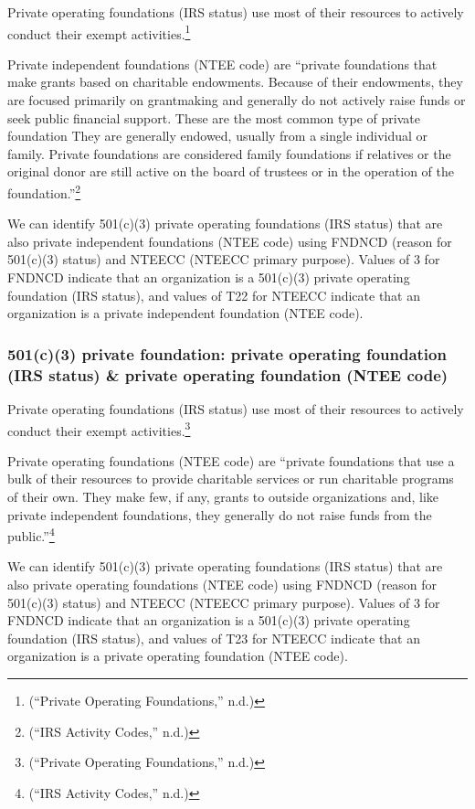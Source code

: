 \documentclass[
  letterpaper,
  DIV=11,
  numbers=noendperiod]{scrreprt}
\begin{document}
Private operating foundations (IRS status) use most of their resources
to actively conduct their exempt activities.\footnote{({``Private
  Operating Foundations,''} n.d.)}

Private independent foundations (NTEE code) are ``private foundations
that make grants based on charitable endowments. Because of their
endowments, they are focused primarily on grantmaking and generally do
not actively raise funds or seek public financial support. These are the
most common type of private foundation They are generally endowed,
usually from a single individual or family. Private foundations are
considered family foundations if relatives or the original donor are
still active on the board of trustees or in the operation of the
foundation.''\footnote{({``IRS Activity Codes,''} n.d.)}

We can identify 501(c)(3) private operating foundations (IRS status)
that are also private independent foundations (NTEE code) using FNDNCD
(reason for 501(c)(3) status) and NTEECC (NTEECC primary purpose).
Values of 3 for FNDNCD indicate that an organization is a 501(c)(3)
private operating foundation (IRS status), and values of T22 for NTEECC
indicate that an organization is a private independent foundation (NTEE
code).

\hypertarget{c3-private-foundation-private-operating-foundation-irs-status-private-operating-foundation-ntee-code}{%
\subsubsection{501(c)(3) private foundation: private operating
foundation (IRS status) \& private operating foundation (NTEE
code)}\label{c3-private-foundation-private-operating-foundation-irs-status-private-operating-foundation-ntee-code}}

Private operating foundations (IRS status) use most of their resources
to actively conduct their exempt activities.\footnote{({``Private
  Operating Foundations,''} n.d.)}

Private operating foundations (NTEE code) are ``private foundations that
use a bulk of their resources to provide charitable services or run
charitable programs of their own. They make few, if any, grants to
outside organizations and, like private independent foundations, they
generally do not raise funds from the public.''\footnote{({``IRS
  Activity Codes,''} n.d.)}

We can identify 501(c)(3) private operating foundations (IRS status)
that are also private operating foundations (NTEE code) using FNDNCD
(reason for 501(c)(3) status) and NTEECC (NTEECC primary purpose).
Values of 3 for FNDNCD indicate that an organization is a 501(c)(3)
private operating foundation (IRS status), and values of T23 for NTEECC
indicate that an organization is a private operating foundation (NTEE
code).
\end{document}
